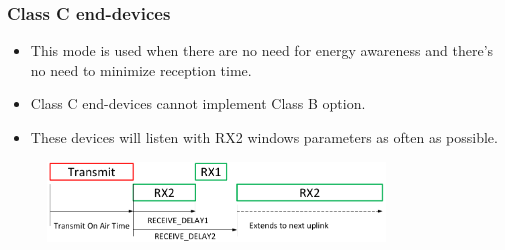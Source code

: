 \begin{frame}[fragile]
	\frametitle{Class C end-devices}
	\begin{itemize}
		\item This mode is used when there are no need for energy awareness and there's no need to minimize reception time.
		\item Class C end-devices cannot implement Class B option.
		\item These devices will listen with RX2 windows parameters as often as possible.
	\end{itemize}
	\begin{figure}
		\centering
		\includegraphics[width=0.8\textwidth]{img/loraClassC.png}
	\end{figure}
\end{frame}
